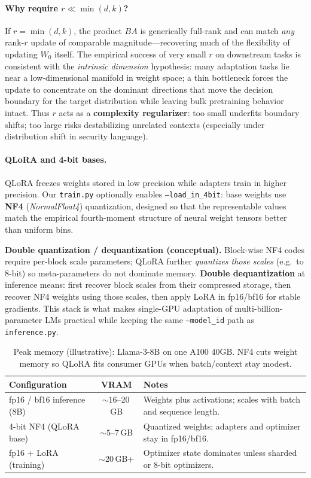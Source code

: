 \documentclass[11pt,a4paper]{article}
\begin{document}
\paragraph{Why require $r \ll \min(d,k)$?}
If $r = \min(d,k)$, the product $BA$ is generically full-rank and can match \emph{any} rank-$r$ update of comparable magnitude---recovering much of the flexibility of updating $W_0$ itself.
The empirical success of very small $r$ on downstream tasks is consistent with the \emph{intrinsic dimension} hypothesis: many adaptation tasks lie near a low-dimensional manifold in weight space; a thin bottleneck forces the update to concentrate on the dominant directions that move the decision boundary for the target distribution while leaving bulk pretraining behavior intact.
Thus $r$ acts as a \textbf{complexity regularizer}: too small underfits boundary shifts; too large risks destabilizing unrelated contexts (especially under distribution shift in security language).

\paragraph{QLoRA and 4-bit bases.}
QLoRA \cite{dettmers2023qlora} freezes weights stored in low precision while adapters train in higher precision.
Our \texttt{train.py} optionally enables \texttt{--load\_in\_4bit}: base weights use \textbf{NF4} (\emph{NormalFloat4}) quantization, designed so that the representable values match the empirical fourth-moment structure of neural weight tensors better than uniform bins.

\textbf{Double quantization / dequantization (conceptual).}
Block-wise NF4 codes require per-block scale parameters; QLoRA further \emph{quantizes those scales} (e.g.\ to 8-bit) so meta-parameters do not dominate memory.
\textbf{Double dequantization} at inference means: first recover block scales from their compressed storage, then recover NF4 weights using those scales, then apply LoRA in fp16/bf16 for stable gradients.
This stack is what makes single-GPU adaptation of multi-billion-parameter LMs practical while keeping the same \texttt{--model\_id} path as \texttt{inference.py}.

\begin{table}[ht]
\centering
\small
\caption{Peak memory (illustrative): Llama-3-8B on one A100 40GB. NF4 cuts weight memory so QLoRA fits consumer GPUs when batch/context stay modest.}
\label{tab:vram-llama8b}
\begin{tabularx}{\linewidth}{p{3.0cm} c >{\raggedright\arraybackslash}X}
\toprule
Configuration & VRAM & Notes \\
\midrule
fp16 / bf16 inference (8B) & ${\sim}16$--20\,GB & Weights plus activations; scales with batch and sequence length. \\
4-bit NF4 (QLoRA base) & ${\sim}5$--7\,GB & Quantized weights; adapters and optimizer stay in fp16/bf16. \\
fp16 + LoRA (training) & ${\sim}20$\,GB+ & Optimizer state dominates unless sharded or 8-bit optimizers. \\
\bottomrule
\end{tabularx}
\end{table}
\end{document}
